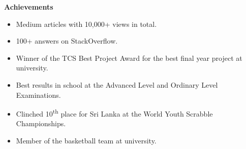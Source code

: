 \documentclass[letterpaper,12pt]{article}[leftmargin=*]
\def \entryspacing {-0pt}
\renewcommand{\section}[2]{\vspace{5pt}
  \colorbox{secondary}{\color{white}\raggedbottom\normalsize\textbf{{#1}{\hspace{7pt}#2}}}
}
\newcommand{\resumeEntryStart}{\begin{itemize}[leftmargin=2.5mm]}
\newcommand{\resumeEntryEnd}{\end{itemize}\vspace{\entryspacing}}
\newcommand{\resumeItemListStart}{\begin{itemize}[leftmargin=4.5mm]}
\newcommand{\resumeItemListEnd}{\end{itemize}}
\newcommand{\resumeItem}[1]{
  \item\small{
    {#1 \vspace{-2pt}}
  }
}
\newcommand{\resumeEntryS}[2]{
  \item[]\small{
    \textbf{\color{primary}#1 }{ #2 \vspace{-6pt}}
  }
}
\begin{document}
\section{\faTrophy}{Achievements}
  \resumeEntryStart
      \resumeItem {Medium articles with 10,000+ views in total.}
      \resumeItem {100+ answers on StackOverflow.}
      \resumeItem {Winner of the TCS Best Project Award for the best final year project at university.}
      \resumeItem {Best results in school at the Advanced Level and Ordinary Level Examinations.}
      \resumeItem {Clinched 10\textsuperscript{th} place for Sri Lanka at the World Youth Scrabble Championships.}
      \resumeItem {Member of the basketball team at university.}
 \resumeEntryEnd

\end{document}
